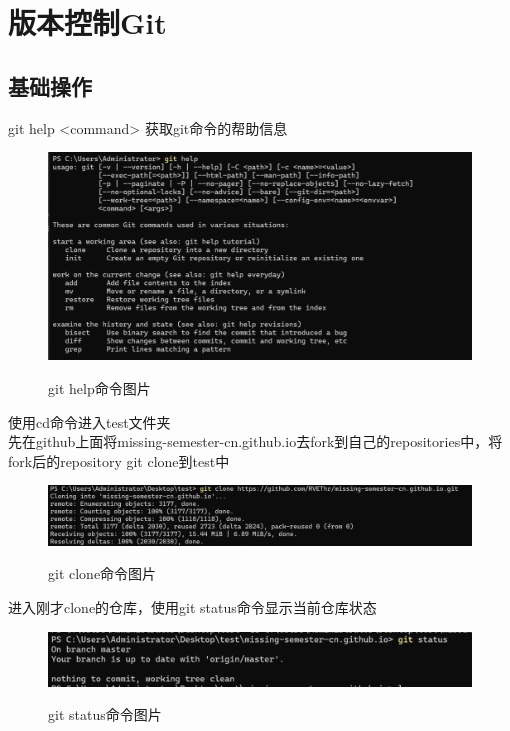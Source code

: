 \documentclass[
    report,     %
    oneside,    %
    UTF8,       %
    zihao=-4    %
]{config} %
\begin{document}
\chapter{版本控制Git}

\section{基础操作}

git help <command> 获取git命令的帮助信息

\begin{figure}[H] %
    \centering %
    \includegraphics[width=0.9\linewidth]{image1.png}
    \caption*{git help命令图片} %
    \caption{} %
    \label{fig:example1} %
\end{figure}
\vspace{-0.7em}  %

使用cd命令进入test文件夹\\

先在github上面将missing-semester-cn.github.io去fork到自己的repositories中，将fork后的repository git clone到test中

\begin{figure}[H] %
    \centering %
    \includegraphics[width=0.9\linewidth]{image2.png}
    \caption*{git clone命令图片} %
    \caption{} %
    \label{fig:example1} %
\end{figure}
\vspace{-0.7em}  %

进入刚才clone的仓库，使用git status命令显示当前仓库状态

\begin{figure}[H] %
    \centering %
    \includegraphics[width=0.9\linewidth]{image3.png}
    \caption*{git status命令图片} %
    \caption{} %
    \label{fig:example1} %
\end{figure}
\vspace{-0.7em}  %
\end{document}

